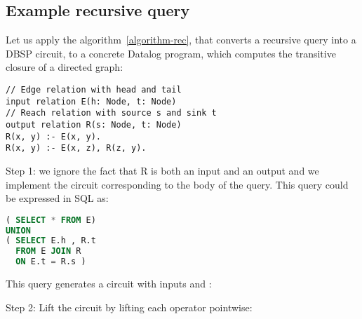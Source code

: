 \subsection{Example recursive query}\label{sec:recursive-example}

Let us apply the algorithm~\ref{algorithm-rec}, that converts a
recursive query into a DBSP circuit, to a concrete Datalog program,
which computes the transitive closure of a directed graph:

\begin{lstlisting}[language=ddlog,basicstyle=\small]
// Edge relation with head and tail
input relation E(h: Node, t: Node)
// Reach relation with source s and sink t
output relation R(s: Node, t: Node)
R(x, y) :- E(x, y).
R(x, y) :- E(x, z), R(z, y).
\end{lstlisting}

Step 1: we ignore the fact that R is both an input and an output and we implement
the \dbsp circuit corresponding to the body of the query.  This query could be expressed
in SQL as:

\begin{lstlisting}[language=SQL,basicstyle=\small]
( SELECT * FROM E)
UNION
( SELECT E.h , R.t
  FROM E JOIN R
  ON E.t = R.s )
\end{lstlisting}

This query generates a \dbsp circuit with inputs  and :


Step 2: Lift the circuit by lifting each operator pointwise:


